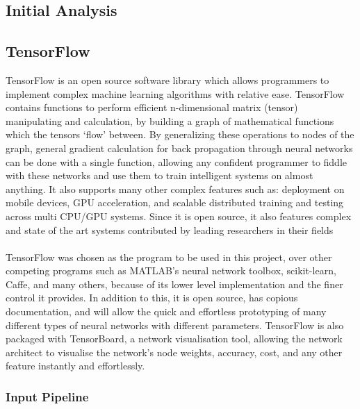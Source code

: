 \documentclass[a4paper,11pt,notitlepage]{article}
\begin{document}
\subsection{Initial Analysis}


\subsection{TensorFlow}\label{section:Tensorflow}


TensorFlow is an open source software library which allows programmers to implement complex machine learning algorithms with relative ease. TensorFlow contains functions to perform efficient n-dimensional matrix (tensor) manipulating and calculation, by building a graph of mathematical functions which the tensors `flow' between. By generalizing these operations to nodes of the graph, general gradient calculation for back propagation through neural networks can be done with a single function, allowing any confident programmer to fiddle with these networks and use them to train intelligent systems on almost anything. It also supports many other complex features such as: deployment on mobile devices, GPU acceleration, and scalable distributed training and testing across multi CPU/GPU systems. Since it is open source, it also features complex and state of the art systems contributed by leading researchers in their fields\\
\\
TensorFlow was chosen as the program to be used in this project, over other competing programs such as MATLAB's neural network toolbox, scikit-learn, Caffe, and many others, because of its lower level implementation and the finer control it provides. In addition to this, it is open source, has copious documentation, and will allow the quick and effortless prototyping of many different types of neural networks with different parameters. TensorFlow is also packaged with TensorBoard, a network visualisation tool, allowing the network architect to visualise the network's node weights, accuracy, cost, and any other feature instantly and effortlessly.

\subsubsection{Input Pipeline}\label{section:input_pipeline}
\end{document}
